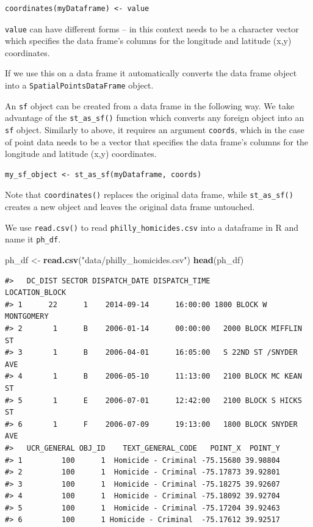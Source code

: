 \documentclass[]{book}
\newenvironment{Shaded}{\begin{snugshade}}{\end{snugshade}}
\newcommand{\KeywordTok}[1]{\textcolor[rgb]{0.13,0.29,0.53}{\textbf{#1}}}
\newcommand{\StringTok}[1]{\textcolor[rgb]{0.31,0.60,0.02}{#1}}
\newcommand{\NormalTok}[1]{#1}
\theoremstyle{definition}
\theoremstyle{definition}
\theoremstyle{definition}
\theoremstyle{remark}
\begin{document}
\begin{verbatim}
coordinates(myDataframe) <- value
\end{verbatim}

\texttt{value} can have different forms -- in this context needs to be a
character vector which specifies the data frame's columns for the
longitude and latitude (x,y) coordinates.

If we use this on a data frame it automatically converts the data frame
object into a \texttt{SpatialPointsDataFrame} object.

An \texttt{sf} object can be created from a data frame in the following
way. We take advantage of the \texttt{st\_as\_sf()} function which
converts any foreign object into an \texttt{sf} object. Similarly to
above, it requires an argument \texttt{coords}, which in the case of
point data needs to be a vector that specifies the data frame's columns
for the longitude and latitude (x,y) coordinates.

\begin{verbatim}
my_sf_object <- st_as_sf(myDataframe, coords)
\end{verbatim}

Note that \texttt{coordinates()} replaces the original data frame, while
\texttt{st\_as\_sf()} creates a new object and leaves the original data
frame untouched.

We use \texttt{read.csv()} to read \texttt{philly\_homicides.csv} into a
dataframe in R and name it \texttt{ph\_df}.

\begin{Shaded}
\begin{Highlighting}[]
\NormalTok{ph_df <-}\StringTok{ }\KeywordTok{read.csv}\NormalTok{(}\StringTok{"data/philly_homicides.csv"}\NormalTok{)}
\KeywordTok{head}\NormalTok{(ph_df)}
\end{Highlighting}
\end{Shaded}

\begin{verbatim}
#>   DC_DIST SECTOR DISPATCH_DATE DISPATCH_TIME          LOCATION_BLOCK
#> 1      22      1    2014-09-14      16:00:00 1800 BLOCK W MONTGOMERY
#> 2       1      B    2006-01-14      00:00:00   2000 BLOCK MIFFLIN ST
#> 3       1      B    2006-04-01      16:05:00   S 22ND ST /SNYDER AVE
#> 4       1      B    2006-05-10      11:13:00   2100 BLOCK MC KEAN ST
#> 5       1      E    2006-07-01      12:42:00   2100 BLOCK S HICKS ST
#> 6       1      F    2006-07-09      19:13:00   1800 BLOCK SNYDER AVE
#>   UCR_GENERAL OBJ_ID    TEXT_GENERAL_CODE   POINT_X  POINT_Y
#> 1         100      1  Homicide - Criminal -75.15680 39.98804
#> 2         100      1  Homicide - Criminal -75.17873 39.92801
#> 3         100      1  Homicide - Criminal -75.18275 39.92607
#> 4         100      1  Homicide - Criminal -75.18092 39.92704
#> 5         100      1  Homicide - Criminal -75.17204 39.92463
#> 6         100      1 Homicide - Criminal  -75.17612 39.92517
\end{verbatim}
\end{document}
